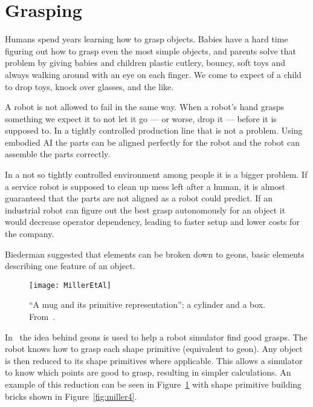 \section{Grasping}
Humans spend years learning how to grasp objects.
Babies have a hard time figuring out how to grasp even the most simple objects,
and parents solve that problem by giving babies and children plastic cutlery, bouncy, soft toys and always walking around with an eye on each finger.
We come to expect of a child to drop toys, knock over glasses, and the like.

A robot is not allowed to fail in the same way.
When a robot's hand grasps something we expect it to not let it go --- or worse, drop it --- before it is supposed to.
In a tightly controlled production line that is not a problem.
Using embodied AI the parts can be aligned perfectly for the robot and the robot can assemble the parts correctly.

In a not so tightly controlled environment among people it is a bigger problem.
If a service robot is supposed to clean up mess left after a human, it is almost guaranteed that the parts are not aligned as a robot could predict.
If an industrial robot can figure out the best grasp autonomously for an object it would decrease operator dependency,
leading to faster setup and lower costs for the company.

\label{ssec:millergrasp}
Biederman suggested that elements can be broken down to geons, basic elements describing one feature of an object.

\begin{figure}
	\centering
	\texttt{[image: MillerEtAl]}
	\caption{``A mug and its primitive representation''; a cylinder and a box. From~\cite{miller}.}
\label{fig:miller3}
\end{figure}

In~\cite{miller} the idea behind geons is used to help a robot simulator find good grasps.
The robot knows how to grasp each shape primitive (equivalent to geon).
Any object is then reduced to its shape primitives where applicable.
This allows a simulator to know which points are good to grasp, resulting in simpler calculations.
An example of this reduction can be seen in Figure~\ref{fig:miller3} with shape primitive building bricks shown in Figure~\ref{fig:miller4}.

